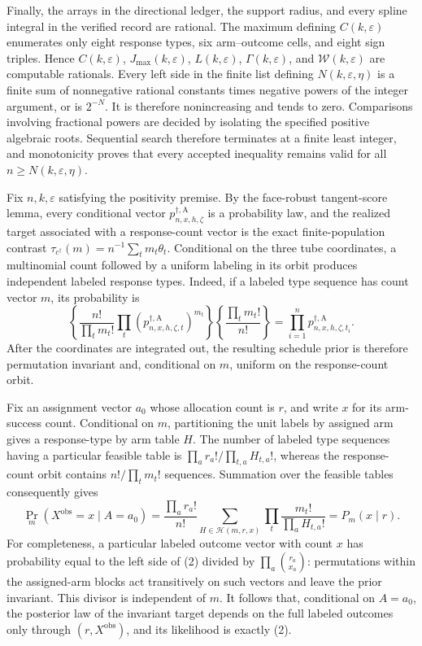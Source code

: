 Finally, the arrays in the directional ledger, the support radius, and every spline
integral in the verified record are rational.  The maximum defining
\(C(k,\varepsilon)\) enumerates only eight response types, six arm--outcome cells,
and eight sign triples.  Hence \(C(k,\varepsilon)\),
\(J_{\max}(k,\varepsilon)\), \(L(k,\varepsilon)\),
\(\Gamma(k,\varepsilon)\), and \(\mathcal W(k,\varepsilon)\) are computable
rationals.  Every left side in the finite list defining
\(N(k,\varepsilon,\eta)\) is a finite sum of nonnegative rational constants times
negative powers of the integer argument, or is \(2^{-N}\).  It is therefore
nonincreasing and tends to zero.  Comparisons involving fractional powers are
decided by isolating the specified positive algebraic roots.  Sequential search
therefore terminates at a finite least integer, and monotonicity proves that every
accepted inequality remains valid for all \(n\ge N(k,\varepsilon,\eta)\).

Fix \(n,k,\varepsilon\) satisfying the positivity premise.  By the face-robust
tangent-score lemma, every conditional vector
\(p_{n,x,h,\zeta}^{\dagger,\mathrm A}\) is a probability law, and the realized
target associated with a response-count vector is the exact finite-population
contrast \(\tau_{c^\dagger}(m)=n^{-1}\sum_tm_t\theta_t\).  Conditional on the
three tube coordinates, a multinomial count followed by a uniform labeling in its
orbit produces independent labeled response types.  Indeed, if a labeled type
sequence has count vector \(m\), its probability is
\[
 \left\{\frac{n!}{\prod_tm_t!}\prod_t
 (p_{n,x,h,\zeta,t}^{\dagger,\mathrm A})^{m_t}\right\}
 \left\{\frac{\prod_tm_t!}{n!}\right\}
 =\prod_{i=1}^np_{n,x,h,\zeta,t_i}^{\dagger,\mathrm A}.
\tag{1}
\]
After the coordinates are integrated out, the resulting schedule prior is therefore
permutation invariant and, conditional on \(m\), uniform on the response-count
orbit.

Fix an assignment vector \(a_0\) whose allocation count is \(r\), and write
\(x\) for its arm-success count.  Conditional on \(m\), partitioning the unit
labels by assigned arm gives a response-type by arm table \(H\).  The number of
labeled type sequences having a particular feasible table is
\(\prod_a r_a!/\prod_{t,a}H_{t,a}!\), whereas the response-count orbit contains
\(n!/\prod_tm_t!\) sequences.  Summation over the feasible tables consequently
gives
\[
 \Pr_m(X^{\mathrm{obs}}=x\mid A=a_0)
 =\frac{\prod_ar_a!}{n!}
 \sum_{H\in\mathcal H(m,r,x)}
 \prod_t\frac{m_t!}{\prod_aH_{t,a}!}
 =P_m(x\mid r).
\tag{2}
\]
For completeness, a particular labeled outcome vector with count \(x\) has
probability equal to the left side of (2) divided by
\(\prod_a\binom{r_a}{x_a}\): permutations within the assigned-arm blocks act
transitively on such vectors and leave the prior invariant.  This divisor is
independent of \(m\).  It follows that, conditional on \(A=a_0\), the posterior
law of the invariant target depends on the full labeled outcomes only through
\((r,X^{\mathrm{obs}})\), and its likelihood is exactly (2).

